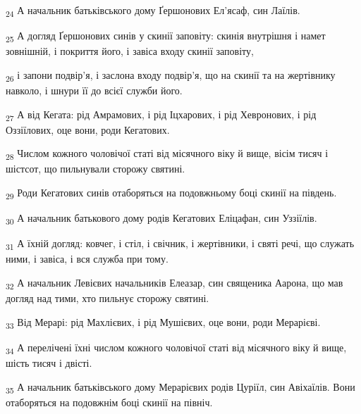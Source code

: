 \begin{tcolorbox}
\textsubscript{24} А начальник батьківського дому Ґершонових Ел'ясаф, син Лаїлів.
\end{tcolorbox}
\begin{tcolorbox}
\textsubscript{25} А догляд Ґершонових синів у скинії заповіту: скинія внутрішня і намет зовнішній, і покриття його, і завіса входу скинії заповіту,
\end{tcolorbox}
\begin{tcolorbox}
\textsubscript{26} і запони подвір'я, і заслона входу подвір'я, що на скинії та на жертівнику навколо, і шнури її до всієї служби його.
\end{tcolorbox}
\begin{tcolorbox}
\textsubscript{27} А від Кегата: рід Амрамових, і рід Іцхарових, і рід Хевронових, і рід Оззіїлових, оце вони, роди Кегатових.
\end{tcolorbox}
\begin{tcolorbox}
\textsubscript{28} Числом кожного чоловічої статі від місячного віку й вище, вісім тисяч і шістсот, що пильнували сторожу святині.
\end{tcolorbox}
\begin{tcolorbox}
\textsubscript{29} Роди Кегатових синів отаборяться на подовжньому боці скинії на південь.
\end{tcolorbox}
\begin{tcolorbox}
\textsubscript{30} А начальник батькового дому родів Кегатових Еліцафан, син Уззіїлів.
\end{tcolorbox}
\begin{tcolorbox}
\textsubscript{31} А їхній догляд: ковчег, і стіл, і свічник, і жертівники, і святі речі, що служать ними, і завіса, і вся служба при тому.
\end{tcolorbox}
\begin{tcolorbox}
\textsubscript{32} А начальник Левієвих начальників Елеазар, син священика Аарона, що мав догляд над тими, хто пильнує сторожу святині.
\end{tcolorbox}
\begin{tcolorbox}
\textsubscript{33} Від Мерарі: рід Махлієвих, і рід Мушієвих, оце вони, роди Мерарієві.
\end{tcolorbox}
\begin{tcolorbox}
\textsubscript{34} А перелічені їхні числом кожного чоловічої статі від місячного віку й вище, шість тисяч і двісті.
\end{tcolorbox}
\begin{tcolorbox}
\textsubscript{35} А начальник батьківського дому Мерарієвих родів Цуріїл, син Авіхаїлів. Вони отаборяться на подовжнім боці скинії на північ.
\end{tcolorbox}
